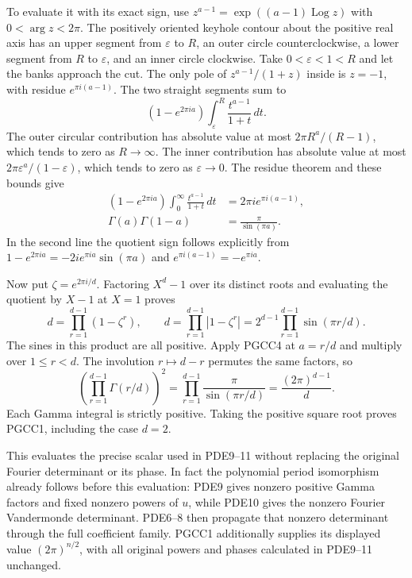 \documentclass[11pt,a4paper]{article}
\begin{document}
To evaluate it with its exact sign, use
$z^{a-1}=\exp((a-1)\operatorname{Log}z)$ with $0<\arg z<2\pi$.
The positively oriented keyhole contour about the positive real axis
has an upper segment from $\varepsilon$ to $R$, an outer circle
counterclockwise, a lower segment from $R$ to $\varepsilon$, and an
inner circle clockwise. Take $0<\varepsilon<1<R$ and let the banks
approach the cut. The only pole of $z^{a-1}/(1+z)$ inside is $z=-1$,
with residue $e^{\pi i(a-1)}$. The two straight segments sum to
\[
 (1-e^{2\pi ia})\int_\varepsilon^R
                       \frac{t^{a-1}}{1+t}\,dt.
 \tag{PGCC3}
\]
The outer circular contribution has absolute value at most
$2\pi R^a/(R-1)$, which tends to zero as $R\to\infty$.
The inner contribution has absolute value at most
$2\pi\varepsilon^a/(1-\varepsilon)$, which tends to zero as
$\varepsilon\to0$. The residue theorem and these bounds give
\[
 \begin{split}
 (1-e^{2\pi ia})\int_0^\infty\frac{t^{a-1}}{1+t}\,dt
 &=2\pi i e^{\pi i(a-1)},\\
 \Gamma(a)\Gamma(1-a)&=\frac{\pi}{\sin(\pi a)}.
 \end{split}\tag{PGCC4}
\]
In the second line the quotient sign follows explicitly from
$1-e^{2\pi ia}=-2i e^{\pi ia}\sin(\pi a)$ and
$e^{\pi i(a-1)}=-e^{\pi ia}$.

Now put $\zeta=e^{2\pi i/d}$. Factoring $X^d-1$ over its distinct
roots and evaluating the quotient by $X-1$ at $X=1$ proves
\[
 d=\prod_{r=1}^{d-1}(1-\zeta^r),\qquad
 d=\prod_{r=1}^{d-1}|1-\zeta^r|
   =2^{d-1}\prod_{r=1}^{d-1}\sin(\pi r/d).
 \tag{PGCC5}
\]
The sines in this product are all positive. Apply PGCC4 at
$a=r/d$ and multiply over $1\leq r<d$. The involution
$r\mapsto d-r$ permutes the same factors, so
\[
 \left(\prod_{r=1}^{d-1}\Gamma(r/d)\right)^2
 =\prod_{r=1}^{d-1}\frac{\pi}{\sin(\pi r/d)}
 =\frac{(2\pi)^{d-1}}d.
 \tag{PGCC6}
\]
Each Gamma integral is strictly positive. Taking the positive square
root proves PGCC1, including the case $d=2$.

This evaluates the precise scalar used in PDE9--11 without replacing
the original Fourier determinant or its phase. In fact the polynomial
period isomorphism already follows before this evaluation: PDE9 gives
nonzero positive Gamma factors and fixed nonzero powers of $u$, while
PDE10 gives the nonzero Fourier Vandermonde determinant. PDE6--8 then
propagate that nonzero determinant through the full coefficient family.
PGCC1 additionally supplies its displayed value $(2\pi)^{n/2}$,
with all original powers and phases calculated in PDE9--11 unchanged.
\end{document}
